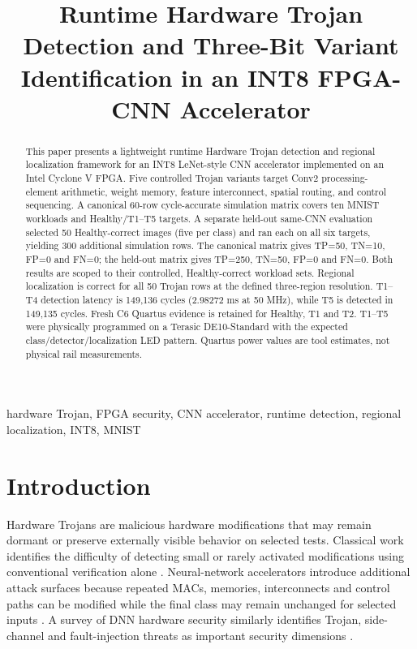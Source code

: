 \documentclass[conference]{IEEEtran}
\title{Runtime Hardware Trojan Detection and Three-Bit Variant Identification in an INT8 FPGA-CNN Accelerator}
\author{\IEEEauthorblockN{Jeevan K. S.}\IEEEauthorblockA{Department of Electronics and Communication Engineering\\IIIT Dharwad, India}}
\begin{document}
\maketitle
\begin{abstract}
This paper presents a lightweight runtime Hardware Trojan detection and regional localization framework for an INT8 LeNet-style CNN accelerator implemented on an Intel Cyclone V FPGA. Five controlled Trojan variants target Conv2 processing-element arithmetic, weight memory, feature interconnect, spatial routing, and control sequencing. A canonical 60-row cycle-accurate simulation matrix covers ten MNIST workloads and Healthy/T1--T5 targets. A separate held-out same-CNN evaluation selected 50 Healthy-correct images (five per class) and ran each on all six targets, yielding 300 additional simulation rows. The canonical matrix gives TP=50, TN=10, FP=0 and FN=0; the held-out matrix gives TP=250, TN=50, FP=0 and FN=0. Both results are scoped to their controlled, Healthy-correct workload sets. Regional localization is correct for all 50 Trojan rows at the defined three-region resolution. T1--T4 detection latency is 149,136 cycles (2.98272 ms at 50 MHz), while T5 is detected in 149,135 cycles. Fresh C6 Quartus evidence is retained for Healthy, T1 and T2. T1--T5 were physically programmed on a Terasic DE10-Standard with the expected class/detector/localization LED pattern. Quartus power values are tool estimates, not physical rail measurements.
\end{abstract}
\begin{IEEEkeywords}
hardware Trojan, FPGA security, CNN accelerator, runtime detection, regional localization, INT8, MNIST
\end{IEEEkeywords}

\section{Introduction}
Hardware Trojans are malicious hardware modifications that may remain dormant or preserve externally visible behavior on selected tests. Classical work identifies the difficulty of detecting small or rarely activated modifications using conventional verification alone \cite{chakraborty2009hardware}. Neural-network accelerators introduce additional attack surfaces because repeated MACs, memories, interconnects and control paths can be modified while the final class may remain unchanged for selected inputs \cite{clements2018hardware}. A survey of DNN hardware security similarly identifies Trojan, side-channel and fault-injection threats as important security dimensions \cite{mittal2021survey}.
\end{document}
